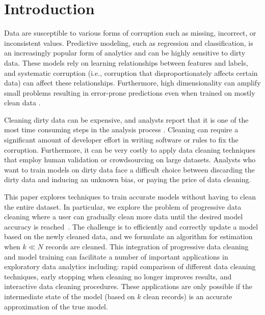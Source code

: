 \section{Introduction}
Data are susceptible to various forms of corruption such as missing, incorrect, or inconsistent values.
Predictive modeling, such as regression and classification, is an increasingly popular form of analytics \cite{bdas, alexandrov2014stratosphere, crotty2014tupleware, hellerstein2012madlib} and can be highly sensitive to dirty data.
These models rely on learning relationships between features and labels, and systematic corruption \cite{taylor1982introduction} (i.e., corruption that disproportionately affects certain data) can affect these relationships.
Furthermore, high dimensionality can amplify small problems resulting in error-prone predictions even when trained on mostly clean data \cite{xiaofeature}.

Cleaning dirty data can be expensive, and analysts report that it is one of the most time consuming steps in the analysis process \cite{nytimes}.
Cleaning can require a significant amount of developer effort in writing software or rules to fix the corruption.
Furthermore, it can be very costly to apply data cleaning techniques that employ human validation or crowdsourcing on large datasets.
Analysts who want to train models on dirty data face a difficult choice between discarding the dirty data and inducing an unknown bias, or paying the price of data cleaning.

This paper explores techniques to train accurate models without having to clean the entire dataset.
In particular, we explore the problem of progressive data cleaning where a user can gradually clean more data until the desired model accuracy is reached~\cite{altowim2014progressive, whang2014incremental, papenbrock2015progressive, gruenheid2014incremental, mayfield2010eracer, DBLP:journals/pvldb/YakoutENOI11, yakout2013don}.
The challenge is to efficiently and correctly update a model based on the newly cleaned data, and we formulate an algorithm for estimation when $k \ll N$ records are cleaned.
This integration of progressive data cleaning and model training can facilitate a number of important applications in exploratory data analytics including: rapid comparison of different data cleaning techniques, early stopping when cleaning no longer improves results, and interactive data cleaning procedures.
These applications are only possible if the intermediate state of the model (based on $k$ clean records) is an accurate approximation of the true model.

